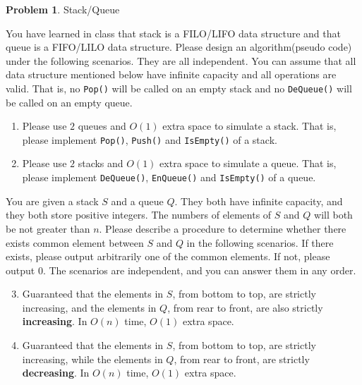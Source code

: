 \documentclass[12pt,a4paper]{report}
\theoremstyle{definition}
\newtheorem{problem}{\textbf{Problem}}
\theoremstyle{definition}
\begin{document}
\begin{problem} Stack/Queue

    You have learned in class that stack is a FILO/LIFO data structure and that queue is a FIFO/LILO data structure.
    Please design an algorithm(pseudo code) under the following scenarios. They are all independent.
    You can assume that all data structure mentioned below have infinite capacity and all operations are valid.
    That is, no \texttt{Pop()} will be called on an empty stack and no \texttt{DeQueue()} will be called on an empty queue.
\begin{enumerate}[label=\alph*.]
    \item Please use $2$ queues and $O(1)$ extra space to simulate a stack. That is, please implement \texttt{Pop()}, \texttt{Push()} and \texttt{IsEmpty()} of a stack.
    \item Please use $2$ stacks and $O(1)$ extra space to simulate a queue. That is, please implement \texttt{DeQueue()}, \texttt{EnQueue()} and \texttt{IsEmpty()} of a queue.
\end{enumerate}
    You are given a stack $S$ and a queue $Q$. They both have infinite capacity, and they both store positive integers. The numbers of elements of $S$ and $Q$ will both be not greater than $n$. Please describe a procedure to determine whether there exists common element between $S$ and $Q$ in the following scenarios. If there exists, please output arbitrarily one of the common elements. If not, please output $0$.  The scenarios are independent, and you can answer them in any order.
\begin{enumerate}[label=\alph*.]
    \setcounter{enumi}{2}
\item Guaranteed that the elements in $S$, from bottom to top, are strictly increasing, and the elements in $Q$, from rear to front, are also strictly \textbf{increasing}. In $O(n)$ time, $O(1)$ extra space.
\item Guaranteed that the elements in $S$, from bottom to top, are strictly increasing, while the elements in $Q$, from rear to front, are strictly \textbf{decreasing}. In $O(n)$ time, $O(1)$ extra space.
\end{enumerate}
\end{problem}
\newpage
\end{document}
